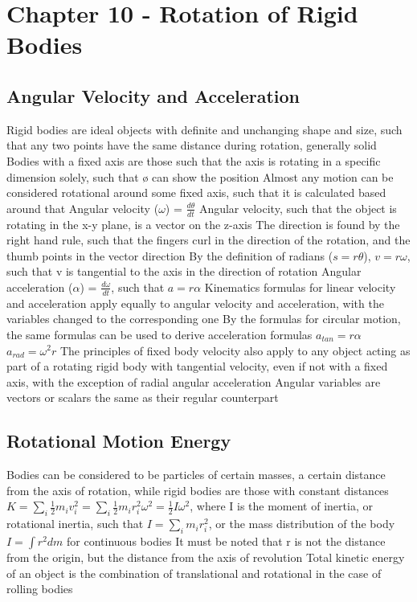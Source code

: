 \documentclass[11 pt, twoside]{article}
\newenvironment{outline*}
{
	\begin{outline}[enumerate]
	}
	{\end{outline}
}
\begin{document}
\section{Chapter 10 - Rotation of Rigid Bodies}
\subsection{Angular Velocity and Acceleration}
\begin{outline*}
\1 Rigid bodies are ideal objects with definite and unchanging shape and size, such that any two points have the same distance during rotation, generally solid
\1 Bodies with a fixed axis are those such that the axis is rotating in a specific dimension solely, such that ø can show the position
\2 Almost any motion can be considered rotational around some fixed axis, such that it is calculated based around that
\1 Angular velocity ($\omega$) = $\frac{d\theta}{dt}$
\2 Angular velocity, such that the object is rotating in the x-y plane, is a vector on the z-axis
\2 The direction is found by the right hand rule, such that the fingers curl in the direction of the rotation, and the thumb points in the vector direction
\2 By the definition of radians ($s = r\theta$), $v = r\omega$, such that v is tangential to the axis in the direction of rotation
\1 Angular acceleration ($\alpha$) = $\frac{d\omega}{dt}$, such that $a = r\alpha$
\1 Kinematics formulas for linear velocity and acceleration apply equally to angular velocity and acceleration, with the variables changed to the corresponding one
\2 By the formulas for circular motion, the same formulas can be used to derive acceleration formulas
\2 $a_{tan} = r\alpha$
\2 $a_{rad} = \omega^2r$
\1 The principles of fixed body velocity also apply to any object acting as part of a rotating rigid body with tangential velocity, even if not with a fixed axis, with the exception of radial angular acceleration
\1 Angular variables are vectors or scalars the same as their regular counterpart 
\end{outline*}
\subsection{Rotational Motion Energy}
\begin{outline*}
\1 Bodies can be considered to be particles of certain masses, a certain distance from the axis of rotation, while rigid bodies are those with constant distances
\1 $K = \sum_i \frac{1}{2}m_iv_i^2 = \sum_i \frac{1}{2}m_ir_i^2\omega^2 = \frac{1}{2}I\omega^2$, where I is the moment of inertia, or rotational inertia, such that $I = \sum_i m_ir_i^2$, or the mass distribution of the body
\1 $I = \int r^2dm$ for continuous bodies
\2 It must be noted that r is not the distance from the origin, but the distance from the axis of revolution
\1 Total kinetic energy of an object is the combination of translational and rotational in the case of rolling bodies
\end{outline*}
\end{document}
